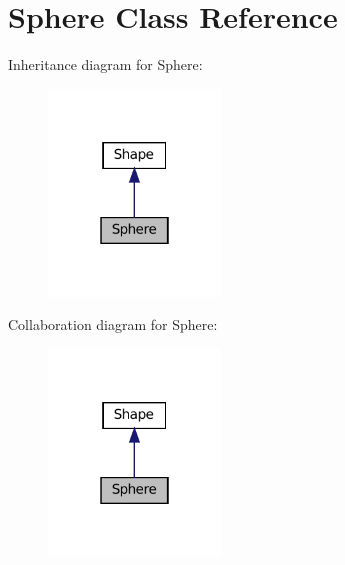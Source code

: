 \hypertarget{classSphere}{}\section{Sphere Class Reference}
\label{classSphere}


Inheritance diagram for Sphere\+:\nopagebreak
\begin{figure}[H]
\begin{center}
\leavevmode
\includegraphics[width=130pt]{classSphere__inherit__graph}
\end{center}
\end{figure}


Collaboration diagram for Sphere\+:\nopagebreak
\begin{figure}[H]
\begin{center}
\leavevmode
\includegraphics[width=130pt]{classSphere__coll__graph}
\end{center}
\end{figure}
